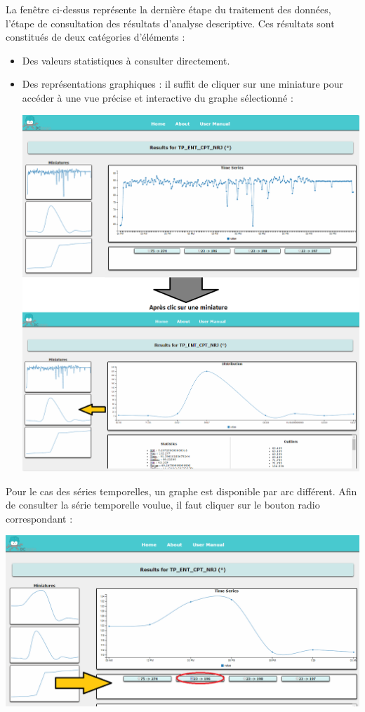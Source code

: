 		La fenêtre ci-dessus représente la dernière étape du traitement des données, l'étape de consultation des résultats d'analyse descriptive. Ces résultats sont constitués de deux catégories d'éléments :
		\begin{itemize}
			\item Des valeurs statistiques à consulter directement.
			\item Des représentations graphiques : il suffit de cliquer sur une miniature pour accéder à une vue précise et interactive du graphe sélectionné :
			\begin{center}\includegraphics[scale=0.40]{fenetre3-2.png}\end{center}\vspace{4em}	
		\end{itemize}
		
		Pour le cas des séries temporelles, un graphe est disponible par arc différent. Afin de consulter la série temporelle voulue, il faut cliquer sur le bouton radio correspondant :
		\begin{center}\includegraphics[scale=0.40]{fenetre3Arcs.png}\end{center}\vspace{4em}
		
